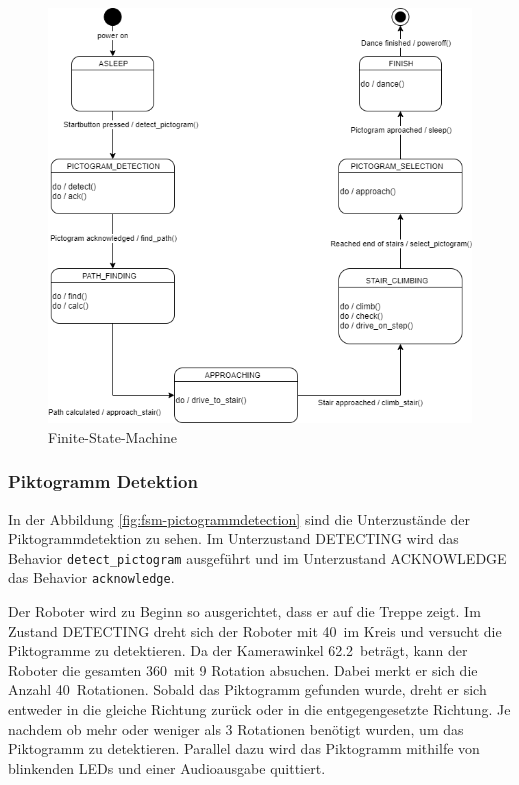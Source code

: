 \begin{figure}[H]
  \includegraphics[width=1\textwidth]{img/softwarearchitektur/FSM-FSM.png}
  \centering
  \caption{Finite-State-Machine}
  \label{fig:fsm}
\end{figure}

\newpage

\subsubsection{Piktogramm Detektion}
In der Abbildung \ref{fig:fsm-pictogrammdetection} sind die Unterzustände der Piktogrammdetektion zu sehen. Im Unterzustand DETECTING wird das Behavior \texttt{detect\_pictogram} ausgeführt und im Unterzustand ACKNOWLEDGE das Behavior \texttt{acknowledge}.

Der Roboter wird zu Beginn so ausgerichtet, dass er auf die Treppe zeigt. Im Zustand DETECTING dreht sich der Roboter mit 40\textdegree\ im Kreis und versucht die Piktogramme zu detektieren. Da der Kamerawinkel 62.2\textdegree\ beträgt, kann der Roboter die gesamten 360\textdegree\  mit 9 Rotation absuchen. Dabei merkt er sich die Anzahl 40\textdegree \ Rotationen. Sobald das Piktogramm gefunden wurde, dreht er sich entweder in die gleiche Richtung zurück oder in die entgegengesetzte Richtung. Je nachdem ob mehr oder weniger als 3 Rotationen benötigt wurden, um das Piktogramm zu detektieren. Parallel dazu wird das Piktogramm mithilfe von blinkenden LEDs und einer Audioausgabe quittiert.


